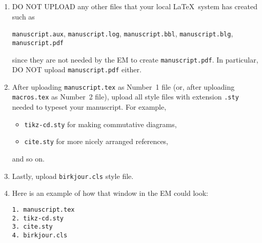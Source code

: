 \documentclass{birkjour}
\theoremstyle{definition}
\theoremstyle{remark}
\newtheorem{comment}[thm]{Comment}
\numberwithin{equation}{section}
\begin{document}
\begin{enumerate}
\item DO NOT UPLOAD any other files that your local \LaTeX\ system has created such as 
\begin{center}
\texttt{manuscript.aux}, \texttt{manuscript.log}, 
\texttt{manuscript.bbl}, \texttt{manuscript.blg}, \texttt{manuscript.pdf}
\end{center}
since they are not needed by the EM to create \texttt{manuscript.pdf}. In particular, DO NOT upload \texttt{manuscript.pdf} either.

\begin{comment}
If you upload \texttt{manuscript.log} or any other text/ASCII file, it will be appended to your paper inside a \texttt{.pdf} file that the EM will create. Thus, do not upload this file or any other text/ASCII file, ONLY upload \texttt{manuscript.tex}.
\end{comment}

\begin{comment}
Sometimes authors store definitions of \LaTeX\ macros in an additional \texttt{.tex} file, call it \texttt{macros.tex}, which is later read into the manuscript with a command \verb++. If so, the file 
\texttt{macros.tex} needs to be uploaded and listed in the system window as Number~2 file.
\end{comment}

\item After uploading \texttt{manuscript.tex} as Number~1 file (or, after uploading \texttt{macros.tex} as Number~2 file), upload all style files with extension \texttt{.sty} needed to typeset your manuscript. For example,

\begin{itemize}
\item \texttt{tikz-cd.sty} for making commutative diagrams,
\item \texttt{cite.sty} for more nicely arranged references,
\end{itemize}
and so on.

\item Lastly, upload \texttt{birkjour.cls} style file.

\item Here is an example of how that window in the EM could look:

\begin{verbatim}
1. manuscript.tex
2. tikz-cd.sty
3. cite.sty
4. birkjour.cls
\end{verbatim}

\begin{comment} 
If your order of files is different than the one shown above, there is a way of reordering these files: in a small window you need to type the order in which files must appear. Then, the system will reorder your files according to the supplied order. 


\end{comment}
\end{enumerate}
\end{document}
